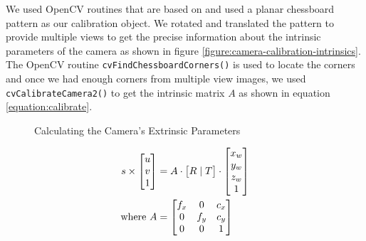 We used OpenCV routines that are based on \cite{zhang:2000} \cite{brown:1971}
and used a planar chessboard pattern as our calibration object. We rotated and
translated the pattern to provide multiple views to get the precise
information about the intrinsic parameters of the camera as shown in figure
\ref{figure:camera-calibration-intrinsics}.  The OpenCV routine
\texttt{cvFindChessboardCorners()} is used to locate the corners and once we
had enough corners from multiple view images, we used
\texttt{cvCalibrateCamera2()} to get the intrinsic matrix $A$ as shown in
equation \ref{equation:calibrate}.

\begin{figure}[ht!]
\centering
{} \quad
{}
\caption{Calculating the Camera's Extrinsic Parameters}
\label{figure:camera-calibration-extrinsics}
\end{figure}

\begin{align}
	\label{equation:calibrate}
	s \times
	\begin{bmatrix}
		u \\ v \\	1 \\
	\end{bmatrix} &= A \cdot \begin{bmatrix}
															R \mid T
	 				  								\end{bmatrix}
										 \cdot \begin{bmatrix}
															x_w \\ y_w \\ z_w \\ 1
														\end{bmatrix} \\
	\text{where}~
	A &= \begin{bmatrix}
					f_x & 0 & c_x \\
					0 & f_y & c_y \\
					0 & 0 & 1 \\
 		 	 \end{bmatrix} \notag
\end{align}

